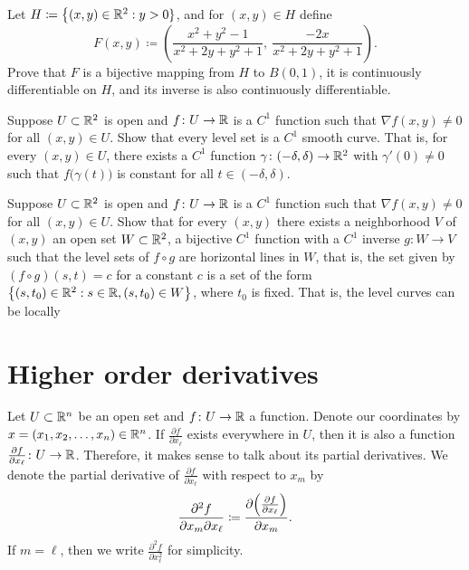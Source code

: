 \begin{exercise}
Let $H \coloneqq \bigl\{ (x,y) \in {\mathbb{R}}^2 : y > 0 \}$, and for $(x,y) \in H$
define
\begin{equation*}
F(x,y) \coloneqq \left(
\frac{x^2+y^2-1}{x^2+2y+y^2+1}
,~
\frac{-2x}{x^2+2y+y^2+1}
\right) .
\end{equation*}
Prove that $F$ is a bijective mapping from $H$ to $B(0,1)$, it is
continuously differentiable on $H$, and its inverse is also continuously
differentiable.
\end{exercise}

\begin{exercise}
Suppose $U \subset {\mathbb{R}}^2$ is open and $f \colon U \to {\mathbb{R}}$ is
a $C^1$ function such
that $\nabla f(x,y) \neq 0$ for all $(x,y) \in U$.  Show that every
level set is a $C^1$ smooth curve.  That is,
for every
$(x,y) \in U$, there exists a $C^1$ function $\gamma \colon (-\delta,\delta)
\to {\mathbb{R}}^2$ with $\gamma'(0) \neq 0$ such that
$f\bigl(\gamma(t)\bigr)$ is constant for all $t \in (-\delta,\delta)$.
\end{exercise}

\begin{exercise}
Suppose $U \subset {\mathbb{R}}^2$ is open and $f \colon U \to {\mathbb{R}}$ is
a $C^1$ function such
that $\nabla f(x,y) \neq 0$ for all $(x,y) \in U$.
Show that for every $(x,y)$ there exists a neighborhood $V$ of $(x,y)$
an open set $W \subset {\mathbb{R}}^2$, a bijective $C^1$ function with
a $C^1$ inverse $g \colon W \to V$ such that
the level sets of $f \circ g$ are horizontal lines in $W$, that is,
the set given by $(f \circ g) (s,t) = c$ for a constant $c$ is a set of the form
$\bigl\{ (s,t_0) \in {\mathbb{R}}^2 : s \in {\mathbb{R}}, (s,t_0) \in W \bigr\}$, where $t_0$ is fixed.
That is, the level curves can be locally 
\end{exercise}


\sectionnewpage
\section{Higher order derivatives}
\label{sec:mvhighordders}


Let $U \subset {\mathbb{R}}^n$ be an open set and $f \colon U \to {\mathbb{R}}$ a function.
Denote our coordinates by $x = (x_1,x_2,\ldots,x_n) \in {\mathbb{R}}^n$.
If $\frac{\partial f}{\partial x_{\ell}}$ exists everywhere in $U$,
then it is also a function $\frac{\partial f}{\partial x_{\ell}}
\colon U \to {\mathbb{R}}$.  Therefore, it makes sense to talk about its partial
derivatives.  We denote 
the partial derivative of $\frac{\partial f}{\partial x_{\ell}}$ with respect to
$x_m$ by
\begin{equation*}
\frac{\partial^2 f}{\partial x_m \partial x_{\ell}}
\coloneqq
\frac{\partial \Bigl( \frac{\partial f}{\partial x_{\ell}} \Bigr)}{\partial x_m} .
\end{equation*}
If $m={\ell}$, then we write 
$\frac{\partial^2 f}{\partial x_{\ell}^2}$ for simplicity.

